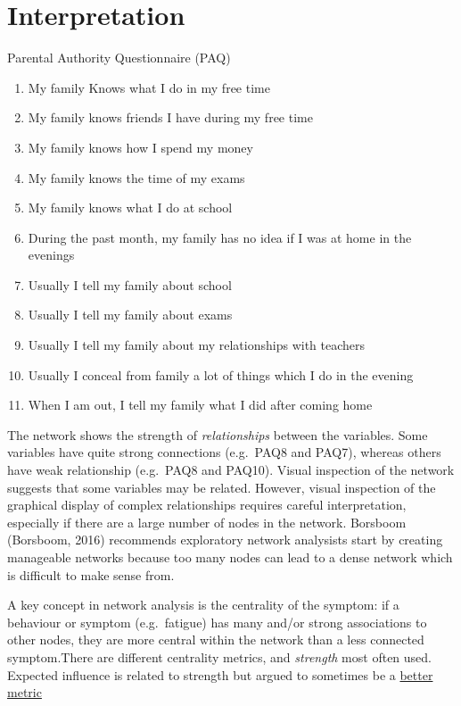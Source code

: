\documentclass[]{book}
\providecommand{\tightlist}{%
  \setlength{\itemsep}{0pt}\setlength{\parskip}{0pt}}
\begin{document}
\hypertarget{interpretation}{%
\section{Interpretation}\label{interpretation}}

{Parental Authority Questionnaire (PAQ)}

\begin{enumerate}
\def\labelenumi{\arabic{enumi}.}
\tightlist
\item
  My family Knows what I do in my free time
\item
  My family knows friends I have during my free time
\item
  My family knows how I spend my money
\item
  My family knows the time of my exams
\item
  My family knows what I do at school
\item
  During the past month, my family has no idea if I was at home in the evenings
\item
  Usually I tell my family about school
\item
  Usually I tell my family about exams
\item
  Usually I tell my family about my relationships with teachers
\item
  Usually I conceal from family a lot of things which I do in the evening
\item
  When I am out, I tell my family what I did after coming home
\end{enumerate}

The network shows the strength of \emph{relationships} between the variables. Some variables have quite strong connections (e.g.~PAQ8 and PAQ7), whereas others have weak relationship (e.g.~PAQ8 and PAQ10). Visual inspection of the network suggests that some variables may be related. However, visual inspection of the graphical display of complex relationships requires careful interpretation, especially if there are a large number of nodes in the network. Borsboom (Borsboom, 2016) recommends exploratory network analysists start by creating manageable networks because too many nodes can lead to a dense network which is difficult to make sense from.

A key concept in network analysis is the centrality of the symptom: if a behaviour or symptom (e.g.~fatigue) has many and/or strong associations to other nodes, they are more central within the network than a less connected symptom.There are different centrality metrics, and \emph{strength} most often used. Expected influence is related to strength but argued to sometimes be a \href{https://psych-networks.com/expected-influence-new-centrality-metric-robinaugh-et-al-2016/}{better metric}
\end{document}
